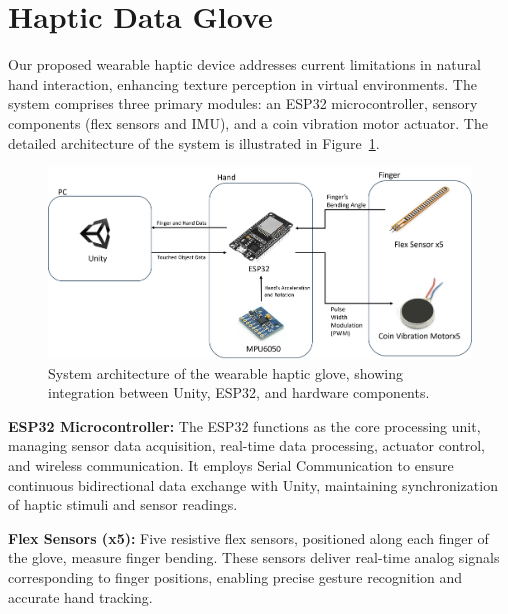 \documentclass[graybox]{svmult}
\begin{document}
\section{Haptic Data Glove}\label{sec:shd}
Our proposed wearable haptic device addresses current limitations in natural hand interaction, enhancing texture perception in virtual environments. The system comprises three primary modules: an ESP32 microcontroller, sensory components (flex sensors and IMU), and a coin vibration motor actuator. The detailed architecture of the system is illustrated in Figure~\ref{fig:system_diagram}.

\begin{figure}\centering
	\includegraphics[width=1\textwidth]{figure/system diagram.png}%
	\caption{System architecture of the wearable haptic glove, showing integration between Unity, ESP32, and hardware components.}\label{fig:system_diagram}
\end{figure}
\textbf{ESP32 Microcontroller:}  
The ESP32 functions as the core processing unit, managing sensor data acquisition, real-time data processing, actuator control, and wireless communication. It employs Serial Communication to ensure continuous bidirectional data exchange with Unity, maintaining synchronization of haptic stimuli and sensor readings.

\textbf{Flex Sensors (x5):}  
Five resistive flex sensors, positioned along each finger of the glove, measure finger bending. These sensors deliver real-time analog signals corresponding to finger positions, enabling precise gesture recognition and accurate hand tracking.
\end{document}
